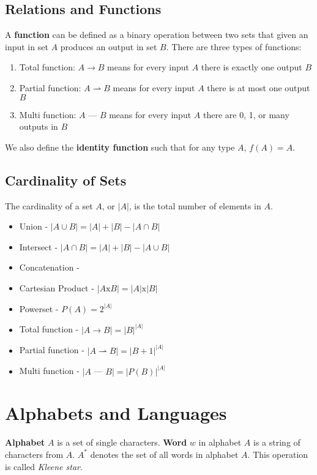\documentclass{article}
\begin{document}
		\subsection{Relations and Functions}
		A \textbf{function} can be defined as a binary operation between two sets that given an input in set $A$ produces an output in set $B$. There are three types of functions:
		\begin{enumerate}
			\item Total function: $A \rightarrow B$ means for every input $A$ there is exactly one output $B$
			\item Partial function: $A \rightharpoonup B$ means for every input $A$ there is at most one output $B$
			\item Multi function: $A$ --- $B$ means for every input $A$ there are 0, 1, or many outputs in $B$
		\end{enumerate}
		We also define the \textbf{identity function} such that for any type $A$, $f(A) = A$.
		\subsection{Cardinality of Sets}
		The cardinality of a set $A$, or $|A|$, is the total number of elements in $A$.
		\begin{itemize}
				\item Union - $|A \cup B| = |A| + |B| - |A \cap B|$
				\item Intersect - $ |A \cap B| = |A| + |B| - |A\cup B|$
				\item Concatenation - 
				\item Cartesian Product - $|A \text{x} B|  = |A| \text{x} |B|$
				\item Powerset - $P(A) = 2^{|A|}$
				\item Total function - $|A \rightarrow B| = |B|^{|A|}$
				\item Partial function - $|A \rightharpoonup B| = |B+1|^{|A|}$
				\item Multi function - $|A$ --- $B| = |P(B)|^{|A|}$
			\end{itemize}
	\section{Alphabets and Languages}
		\textbf{Alphabet} $A$ is a set of single characters. \textbf{Word} $w$ in alphabet $A$ is a string of characters from $A$. $A^*$ denotes the set of all words in alphabet $A$. This operation is called \emph{Kleene star}.
\end{document}
